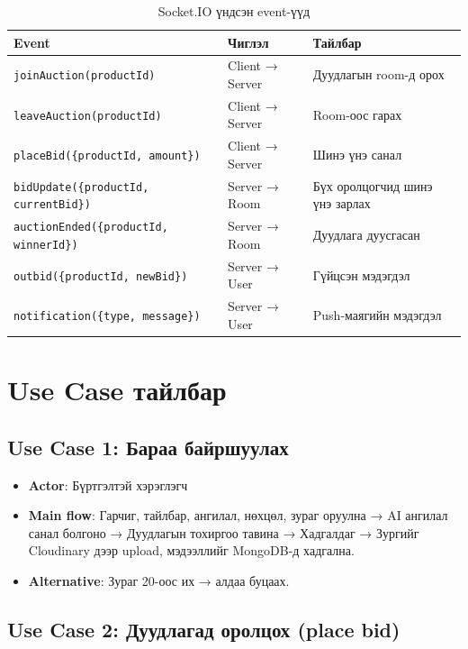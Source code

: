 \documentclass[12pt, a4paper]{report}
\begin{document}
\begin{table}[H]
  \centering
  \caption{Socket.IO үндсэн event-үүд}
  \label{tab:socket-events}
  \begin{tabularx}{\textwidth}{L{4.5cm}L{3cm}L{6.5cm}}
    \toprule
    \textbf{Event} & \textbf{Чиглэл} & \textbf{Тайлбар} \\
    \midrule
    \texttt{joinAuction(productId)} & Client → Server & Дуудлагын room-д орох \\
    \texttt{leaveAuction(productId)} & Client → Server & Room-оос гарах \\
    \texttt{placeBid(\{productId, amount\})} & Client → Server & Шинэ үнэ санал \\
    \texttt{bidUpdate(\{productId, currentBid\})} & Server → Room & Бүх оролцогчид шинэ үнэ зарлах \\
    \texttt{auctionEnded(\{productId, winnerId\})} & Server → Room & Дуудлага дуусгасан \\
    \texttt{outbid(\{productId, newBid\})} & Server → User & Гүйцсэн мэдэгдэл \\
    \texttt{notification(\{type, message\})} & Server → User & Push-маягийн мэдэгдэл \\
    \bottomrule
  \end{tabularx}
\end{table}

\section{Use Case тайлбар}

\subsection{Use Case 1: Бараа байршуулах}

\begin{itemize}
  \item \textbf{Actor}: Бүртгэлтэй хэрэглэгч
  \item \textbf{Main flow}: Гарчиг, тайлбар, ангилал, нөхцөл, зураг оруулна → AI ангилал санал болгоно → Дуудлагын тохиргоо тавина → Хадгалдаг → Зургийг Cloudinary дээр upload, мэдээллийг MongoDB-д хадгална.
  \item \textbf{Alternative}: Зураг 20-оос их → алдаа буцаах.
\end{itemize}

\subsection{Use Case 2: Дуудлагад оролцох (place bid)}
\end{document}
